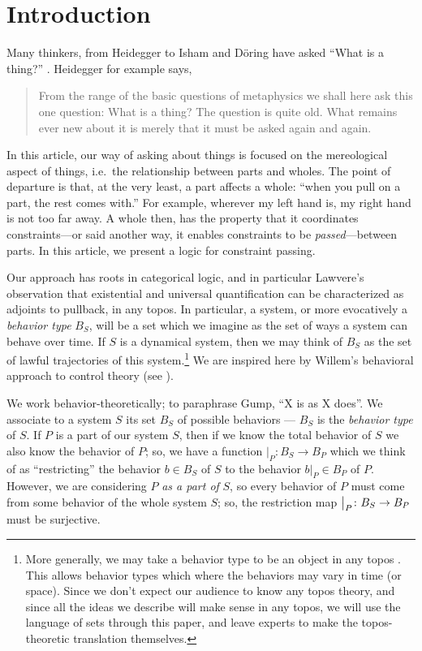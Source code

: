 
\section{Introduction}

Many thinkers, from Heidegger to Isham and D\"{o}ring have asked ``What is a thing?'' \cite{heidegger1972thing, doring2010thing}. Heidegger for example says,
\begin{quote}
    From the range of the basic questions of metaphysics we shall here ask this one question: What is a thing? The question is quite old. What remains ever new about it is merely that it must be asked again and again.
\end{quote}
In this article, our way of asking about things is focused on the mereological aspect of things, i.e.\ the relationship between parts and wholes. The point of departure is that, at the very least, a part affects a whole: ``when you pull on a part, the rest comes with.'' For example, wherever my left hand is, my right hand is not too far away. A whole then, has the property that it coordinates constraints---or said another way, it enables constraints to be \emph{passed}---between parts. In this article, we present a logic for constraint passing.

Our approach has roots in categorical logic, and in particular Lawvere's
observation that existential and universal quantification can be characterized
as adjoints to pullback, in any topos. In particular, a system, or more
evocatively a \emph{behavior type} $B_S$, will be a set which we imagine as the
set of ways a system can behave over time. If $S$ is a dynamical system, then we
may think of $B_S$ as the set of lawful trajectories of this system.\footnote{More generally, we may take a behavior type to be an object in
  any topos \cite{MacLane.Moerdijk:1992a}. This allows behavior types which
  where the behaviors may vary in time (or space). Since we don't expect our
  audience to know any topos theory, and since all the ideas we describe will
  make sense in any topos, we will use the language of sets through this paper,
  and leave experts to make the topos-theoretic translation themselves.} We are
inspired here by Willem's behavioral approach to control theory (see \cites{Willems:1998a}{Willems:2007a}{Willems.Polderman:2013a}).

We work behavior-theoretically; to paraphrase Gump, ``X is as X does''. We
associate to a system $S$ its set $B_S$ of possible behaviors --- $B_S$ is the
\emph{behavior type} of $S$. If $P$ is a part
of our system $S$, then if we know the total behavior of $S$ we also know the
behavior of $P$; so, we have a function $|_P : B_S \to B_P$ which we think of as
``restricting'' the behavior $b \in B_S$ of $S$ to the behavior $b|_P \in B_P$
of $P$. However, we are considering $P$ \emph{as a part of} $S$, so every
behavior of $P$ must come from some behavior of the whole system $S$; so, the
restriction map $\big|_{P}\colon B_S \to B_P$ must be surjective.

